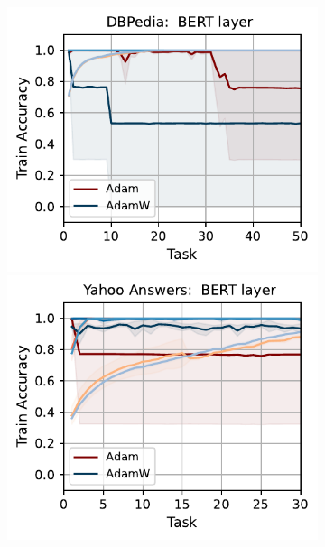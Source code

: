 \begin{figure}[htb!]
{\begin{figure}[t]
{        \includegraphics[width=\textwidth]{figs/Accuracy/nlp/bert_layer/dbpedia_40.pdf}
        \includegraphics[width=\textwidth]{figs/Accuracy/nlp/bert_layer/yahoo_answers_40.pdf}
}
\end{figure}}
\end{figure}
